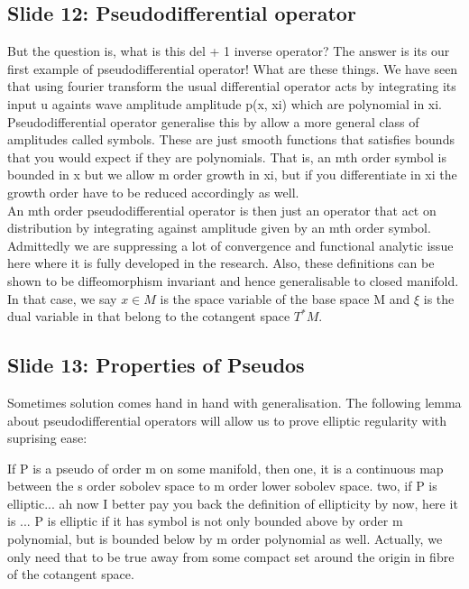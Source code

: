\documentclass{article}
\begin{document}
\subsection{Slide 12: Pseudodifferential operator}
But the question is, what is this del + 1 inverse operator? The answer is its our first example of pseudodifferential operator! What are these things. We have seen that using fourier transform the usual differential operator acts by integrating its input u againts wave amplitude amplitude p(x, xi) which are polynomial in xi. Pseudodifferential operator generalise this by allow a more general class of amplitudes called symbols. These are just smooth functions that satisfies bounds that you would expect if they are polynomials. 
That is, an mth order symbol is bounded in x but we allow m order growth in xi, but if you differentiate in xi the growth order have to be reduced accordingly as well. \\


An mth order pseudodifferential operator is then just an operator that act on distribution by integrating against amplitude given by an mth order symbol. \\

Admittedly we are suppressing a lot of convergence and functional analytic issue here where it is fully developed in the research. Also, these definitions can be shown to be diffeomorphism invariant and hence generalisable to closed manifold. In that case, we say $x \in M$ is the space variable of the base space M and $\xi$ is the dual variable in that belong to the cotangent space $T^*M$. 

\subsection{Slide 13: Properties of Pseudos} 
Sometimes solution comes hand in hand with generalisation. The following lemma about pseudodifferential operators will allow us to prove elliptic regularity with suprising ease: 

If P is a pseudo of order m on some manifold, then 
one, it is a continuous map between the s order sobolev space to m order lower sobolev space. 
two, if P is elliptic... ah now I better pay you back the definition of ellipticity by now, here it is ... P is elliptic if it has symbol is not only bounded above by order m polynomial, but is bounded below by m order polynomial as well. Actually, we only need that to be true away from some compact set around the origin in fibre of the cotangent space. 
\end{document}
